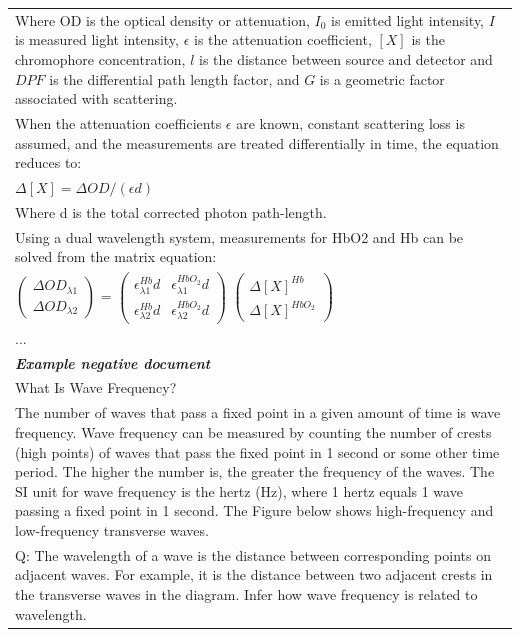 \begin{table}[ht]
\begin{tabular}{p{13cm}}
Where OD is the optical density or attenuation, $I_0$ is emitted light intensity, $I$ is measured light intensity, $\epsilon$ is the attenuation coefficient, $[X]$ is the chromophore concentration, $l$ is the distance between source and detector and $DPF$ is the differential path length factor, and $G$ is a geometric factor associated with scattering. \\
When the attenuation coefficients $\epsilon$ are known, constant scattering loss is assumed, and the measurements are treated differentially in time, the equation reduces to: \\
$\Delta [X] = \Delta OD/(\epsilon d)$ \\
Where d is the total corrected photon path-length. \\
Using a dual wavelength system, measurements for HbO2 and Hb can be solved from the matrix equation: \\
$
\begin{pmatrix}
\Delta OD_{\lambda 1} \\
\Delta OD_{\lambda 2}
\end{pmatrix}
$
=
$
\begin{pmatrix}
\epsilon^{Hb}_{\lambda 1} d & \epsilon^{HbO_2}_{\lambda 1} d \\
\epsilon^{Hb}_{\lambda 2} d & \epsilon^{HbO_2}_{\lambda 2} d 
\end{pmatrix}
$
$
\begin{pmatrix}
\Delta [X]^{Hb} \\
\Delta [X]^{HbO_2}
\end{pmatrix}
$ \\
... \\
\midrule
\textit{\textbf{Example negative document}} \\
\midrule
What Is Wave Frequency? \\
The number of waves that pass a fixed point in a given amount of time is wave frequency. Wave frequency can be measured by counting the number of crests (high points) of waves that pass the fixed point in 1 second or some other time period. The higher the number is, the greater the frequency of the waves. The SI unit for wave frequency is the hertz (Hz), where 1 hertz equals 1 wave passing a fixed point in 1 second. The Figure below shows high-frequency and low-frequency transverse waves. \\
Q: The wavelength of a wave is the distance between corresponding points on adjacent waves. For example, it is the distance between two adjacent crests in the transverse waves in the diagram. Infer how wave frequency is related to wavelength. \\

\end{tabular}
\end{table}
